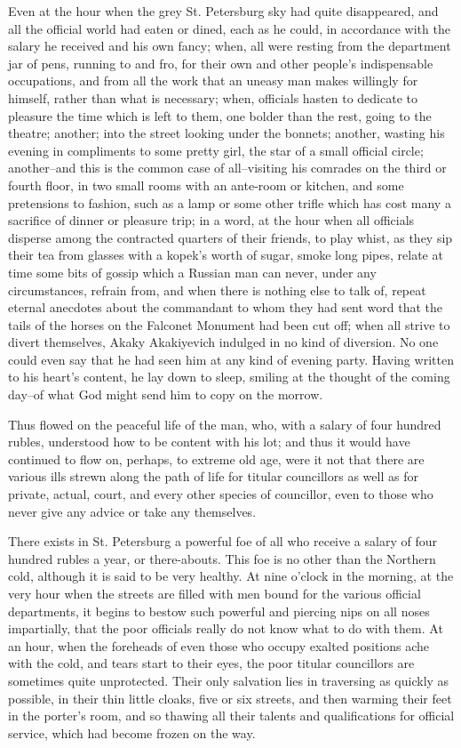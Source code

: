 Even at the hour when the grey St. Petersburg sky had quite
disappeared, and all the official world had eaten or dined, each as he
could, in accordance with the salary he received and his own fancy;
when, all were resting from the department jar of pens, running to and
fro, for their own and other people's indispensable occupations, and
from all the work that an uneasy man makes willingly for himself,
rather than what is necessary; when, officials hasten to dedicate to
pleasure the time which is left to them, one bolder than the rest,
going to the theatre; another; into the street looking under the
bonnets; another, wasting his evening in compliments to some pretty
girl, the star of a small official circle; another--and this is the
common case of all--visiting his comrades on the third or fourth
floor, in two small rooms with an ante-room or kitchen, and some
pretensions to fashion, such as a lamp or some other trifle which has
cost many a sacrifice of dinner or pleasure trip; in a word, at the
hour when all officials disperse among the contracted quarters of
their friends, to play whist, as they sip their tea from glasses with
a kopek's worth of sugar, smoke long pipes, relate at time some bits
of gossip which a Russian man can never, under any circumstances,
refrain from, and when there is nothing else to talk of, repeat
eternal anecdotes about the commandant to whom they had sent word that
the tails of the horses on the Falconet Monument had been cut off;
when all strive to divert themselves, Akaky Akakiyevich indulged in no
kind of diversion. No one could even say that he had seen him at any
kind of evening party. Having written to his heart's content, he lay
down to sleep, smiling at the thought of the coming day--of what God
might send him to copy on the morrow.

Thus flowed on the peaceful life of the man, who, with a salary of
four hundred rubles, understood how to be content with his lot; and
thus it would have continued to flow on, perhaps, to extreme old age,
were it not that there are various ills strewn along the path of life
for titular councillors as well as for private, actual, court, and
every other species of councillor, even to those who never give any
advice or take any themselves.

There exists in St. Petersburg a powerful foe of all who receive a
salary of four hundred rubles a year, or there-abouts. This foe is no
other than the Northern cold, although it is said to be very healthy.
At nine o'clock in the morning, at the very hour when the streets are
filled with men bound for the various official departments, it begins
to bestow such powerful and piercing nips on all noses impartially,
that the poor officials really do not know what to do with them. At an
hour, when the foreheads of even those who occupy exalted positions
ache with the cold, and tears start to their eyes, the poor titular
councillors are sometimes quite unprotected. Their only salvation lies
in traversing as quickly as possible, in their thin little cloaks,
five or six streets, and then warming their feet in the porter's room,
and so thawing all their talents and qualifications for official
service, which had become frozen on the way.

